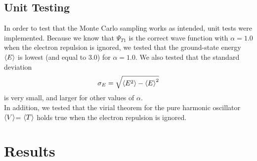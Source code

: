 \documentclass[10pt,a4paper]{article}
\begin{document}
\subsection{Unit Testing}
In order to test that the Monte Carlo sampling works as intended, unit tests were implemented. Because we know that $\Psi_{T1}$ is the correct wave function with $\alpha=1.0$ when the electron repulsion is ignored, we tested that the ground-state energy $\braket{E}$ is lowest (and equal to 3.0) for $\alpha=1.0$. We also tested that the standard deviation
\begin{equation}
\sigma_E = \sqrt{\braket{E^2}-\braket{E}^2}
\end{equation}
is very small, and larger for other values of $\alpha$. \\
In addition, we tested that the virial theorem for the pure harmonic oscillator  $\braket{V}$= $\braket{T}$ holds true when the electron repulsion is ignored.
\section{Results}
\end{document}
